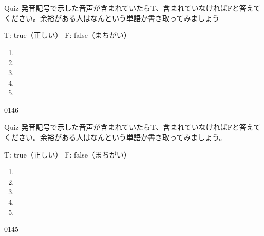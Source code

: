 \documentclass[aspectratio=169,xcolor={dvipsnames,table}]{beamer}
\begin{document}
\begin{frame}[plain]{Quiz }
\large
発音記号で示した音声が含まれていたらT、含まれていなければFと答えてください。余裕がある人はなんという単語か書き取ってみましょう

\hfill{}{\scriptsize T: true（正しい）\hspace{5pt} F: false（まちがい）}
 \begin{enumerate}
  \item \mbox{}\hspace{1\zw}
  \item \mbox{}\hspace{1\zw}
  \item \mbox{}\hspace{1\zw}
  \item \mbox{}\hspace{1\zw}
  \item \mbox{}\hspace{1\zw}
 \end{enumerate}

\hfill{\tiny 0146}\,{\scriptsize {}}
\end{frame}
\begin{frame}[plain]{Quiz }
\hypertarget{ex}{}
\large
発音記号で示した音声が含まれていたらT、含まれていなければFと答えてください。余裕がある人はなんという単語か書き取ってみましょう。

\hfill{}{\scriptsize T: true（正しい）\hspace{5pt} F: false（まちがい）}
 \begin{enumerate}
  \item \mbox{}\visible<2->{T}\hspace{1\zw}
  \item \mbox{}\hspace{1\zw}
  \item \mbox{}\hspace{1\zw}
  \item \mbox{}\visible<5->{T}\hspace{1\zw}
  \item \mbox{}\hspace{1\zw}
 \end{enumerate}

\hfill{\tiny 0145}\,{\scriptsize {}}
\end{frame}
\end{document}
